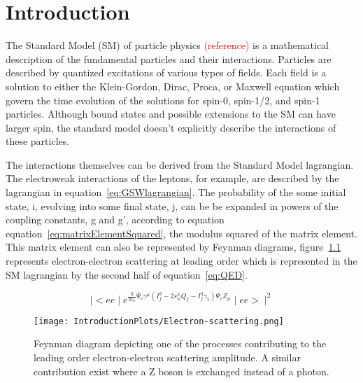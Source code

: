 \chapter{Introduction}
\label{sec:intro}

The Standard Model (SM) of particle physics \textcolor{red}{(reference)} 
is a mathematical description of the fundamental particles and their 
interactions.  Particles are described by quantized excitations of 
various types of fields.  Each field is a solution to either the
Klein-Gordon, Dirac, Proca, or Maxwell equation which govern the time
evolution of the solutions for spin-0, spin-1/2, and spin-1 particles.
Although bound states and possible extensions to the SM can have
larger spin, the standard model doesn't explicitly describe the interactions
of these particles.

The interactions themselves can be derived from the Standard Model lagrangian.
The electroweak interactions of the leptons, for example, are described by
the lagrangian in equation~\ref{eq:GSWlagrangian}.  The probability of the
some initial state, i, evolving into some final state, j, can be 
be expanded in powers of the coupling constants, g and g', according to 
equation equation~\ref{eq:matrixElementSquared}, the modulus squared of the
matrix element.  This matrix element
can also be represented by Feynman diagrams, 
figure~\ref{fyn:eeScattering} 
represents electron-electron scattering at leading order which is 
represented in the SM lagrangian by the second half of 
equation~\ref{eq:QED}.

\begin{center}
\begin{equation}
\mid<ee\mid e^{\frac{g}{2c_w}\bar{\Psi}_e\gamma^{\mu}(I_f^3-2s_w^2Q_f-I_f^3\gamma_5)\Psi_eZ_{\mu}}\mid ee>\mid^2
\label{eq:matrixElementSquared}
\end{equation}
\end{center}

\begin{figure}
\begin{center}
\texttt{[image: IntroductionPlots/Electron-scattering.png]}
\label{fyn:eeScattering}
\caption{Feynman diagram depicting one of the processes contributing to the leading order
electron-electron scattering amplitude. A similar contribution exist where a Z boson is
exchanged instead of a photon.}
\end{center}
\end{figure}

